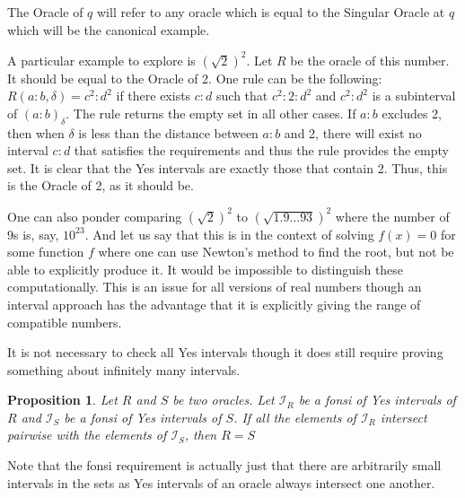 \documentclass[12pt]{article}
\newtheorem{proposition}{Proposition}[section]
\begin{document}
The Oracle of $q$ will refer to any oracle which is equal to the Singular Oracle at $q$ which will be the canonical example. 

A particular example to explore is $(\sqrt{2})^2$. Let $R$ be the oracle of this number. It should be equal to the Oracle of 2. One rule can be the following: $R(a:b, \delta) = c^2:d^2$ if there exists $c:d$ such that $c^2:2:d^2$ and $c^2:d^2$ is a subinterval of $(a:b)_\delta$. The rule returns the empty set in all other cases. If $a:b$ excludes 2,  then when $\delta$ is less than the distance between $a:b$ and 2, there will exist no interval $c:d$ that satisfies the requirements and thus the rule provides the empty set. It is clear that the Yes intervals are exactly those that contain 2. Thus, this is the Oracle of 2, as it should be. 

One can also ponder comparing $(\sqrt{2})^2$ to $(\sqrt{1.9\ldots93})^2$ where the number of 9s is, say, $10^{23}$. And let us say that this is in the context of solving $f(x) = 0$ for some function $f$ where one can use Newton's method to find the root, but not be able to explicitly produce it. It would be impossible to distinguish these computationally. This is an issue for all versions of real numbers though an interval approach has the advantage that it is explicitly giving the range of compatible numbers. 

It is not necessary to check all Yes intervals though it does still require proving something about infinitely many intervals.

\begin{proposition}
Let $R$ and $S$ be two oracles. Let $\mathcal{I}_R$ be a fonsi of Yes intervals of $R$ and $\mathcal{I}_S$ be a fonsi of Yes intervals of $S$. If all the elements of $\mathcal{I}_R$ intersect pairwise with the elements of $\mathcal{I}_S$, then $R=S$
\end{proposition}

Note that the fonsi requirement is actually just that there are arbitrarily small intervals in the sets as Yes intervals of an oracle always intersect one another. 
\end{document}
